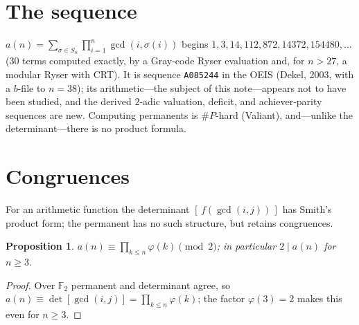 \documentclass[11pt]{article}
\newtheorem{proposition}[theorem]{Proposition}
\theoremstyle{remark}\newtheorem{remark}[theorem]{Remark}
\begin{document}
\section{The sequence}
$a(n)=\sum_{\sigma\in S_n}\prod_{i=1}^n\gcd(i,\sigma(i))$ begins
$1,3,14,112,872,14372,154480,\dots$ (30 terms computed exactly, by a Gray-code
Ryser evaluation \cite{Ryser} and, for $n>27$, a modular Ryser with CRT). It is sequence
\texttt{A085244} in the OEIS (Dekel, 2003, with a $b$-file to $n=38$); its
arithmetic---the subject of this note---appears not to have been studied, and the
derived $2$-adic valuation, deficit, and achiever-parity sequences are new.
Computing permanents is $\#P$-hard (Valiant), and---unlike the
determinant---there is no product formula.

\section{Congruences}
For an arithmetic function the determinant $[\,f(\gcd(i,j))\,]$ has Smith's
product form; the permanent has no such structure, but retains congruences.

\begin{proposition}\label{prop:par}
$a(n)\equiv\prod_{k\le n}\varphi(k)\pmod 2$; in particular $2\mid a(n)$ for
$n\ge 3$.
\end{proposition}
\begin{proof}
Over $\mathbb F_2$ permanent and determinant agree, so $a(n)\equiv
\det[\gcd(i,j)]=\prod_{k\le n}\varphi(k)$; the factor $\varphi(3)=2$ makes this
even for $n\ge 3$.
\end{proof}
\end{document}
